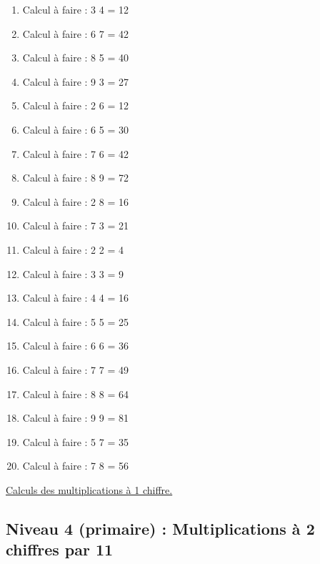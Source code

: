 \documentclass[11pt]{article}
\begin{document}
\begin{enumerate}
\item Calcul à faire :  3\texttimes{} 4 = 12
\item Calcul à faire :  6\texttimes{} 7 = 42
\item Calcul à faire :  8\texttimes{} 5 = 40
\item Calcul à faire :  9\texttimes{} 3 = 27
\item Calcul à faire :  2\texttimes{} 6 = 12
\item Calcul à faire :  6\texttimes{} 5 = 30
\item Calcul à faire :  7\texttimes{} 6 = 42
\item Calcul à faire :  8\texttimes{} 9 = 72
\item Calcul à faire :  2\texttimes{} 8 = 16
\item Calcul à faire :  7\texttimes{} 3 = 21
\item Calcul à faire :  2\texttimes{} 2 = 4
\item Calcul à faire :  3\texttimes{} 3 = 9
\item Calcul à faire :  4\texttimes{} 4 = 16
\item Calcul à faire :  5\texttimes{} 5 = 25
\item Calcul à faire :  6\texttimes{} 6 = 36
\item Calcul à faire :  7\texttimes{} 7 = 49
\item Calcul à faire :  8\texttimes{} 8 = 64
\item Calcul à faire :  9\texttimes{} 9 = 81
\item Calcul à faire :  5\texttimes{} 7 = 35
\item Calcul à faire :  7\texttimes{} 8 = 56
\end{enumerate}




\hyperref[org3d332d1]{Calculs des multiplications à 1 chiffre.}



\newpage


\subsection{Niveau 4 (primaire) : Multiplications à 2 chiffres par 11}
\label{sec:org6778e70}
\label{org6ccdea9}
\end{document}
